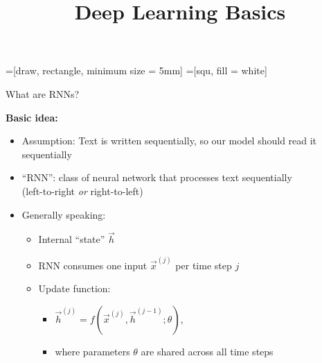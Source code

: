 



=[draw, rectangle, minimum size = 5mm]
=[squ, fill = white]

\newcommand{\titlefigure}{figure/rnn.png}
\newcommand{\learninggoals}{
\item Understand recurent structure of RNNs
\item Learn the different types of RNNs
\item Understand applicability of RNNs}

\title{Deep Learning Basics}
\date{}




\begin{vbframe}{What are RNNs?}

\vfill

\textbf{Basic idea:}

\begin{itemize}
	\item Assumption: Text is written sequentially, so our model should read it sequentially
	\item ``RNN'': class of neural network that processes text sequentially\\
				(left-to-right \textit{or} right-to-left)
	\item Generally speaking:
		\begin{itemize}
			\item Internal ``state'' $\vec h$
			\item RNN consumes one input $\vec x^{(j)}$ per time step $j$
			\item Update function:
			\begin{itemize}
				\item $\vec h^{(j)} = f(\vec x^{(j)}, \vec h^{({j-1})}; \theta)$,
				\item where parameters $\theta$ are shared across all time steps
			\end{itemize}
		\end{itemize}
\end{itemize}

\vfill

\end{vbframe}

